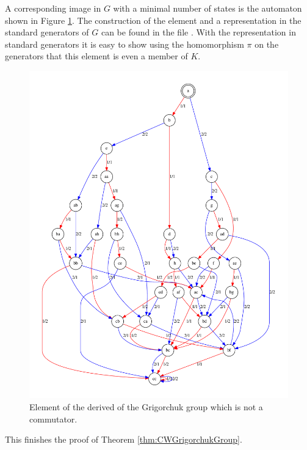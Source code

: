 \documentclass[a4paper,11pt]{amsart}
\begin{document}
 A corresponding image in $G$ with a minimal number of states is the automaton shown in Figure \ref{fig:noncomm}. 
The construction of the element and a representation in the standard generators of $G$ can be found in the file
 . With the representation in standard generators it is easy to show using the 
 homomorphism $\pi$ on the generators that this element is even a member of $K$.
\begin{figure}
 \includegraphics[width=\textwidth]{gap/PCD/noncomm29states}
 \caption{Element of the derived of the Grigorchuk group which is not a commutator.}\label{fig:noncomm}
\end{figure}
This finishes the proof of Theorem \ref{thm:CWGrigorchukGroup}.
\end{document}
